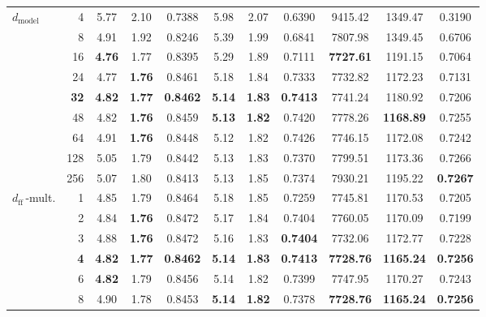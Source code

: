 \begin{longtable}{@{} l r  ccc  ccc  ccc @{}}
\multirow{9}{*}{$d_\mathrm{model}$}
  & 4            & 5.77 & 2.10 & 0.7388 & 5.98 & 2.07 & 0.6390 & 9415.42 & 1349.47 & 0.3190 \\
  & 8            & 4.91 & 1.92 & 0.8246 & 5.39 & 1.99 & 0.6841 & 7807.98 & 1349.45 & 0.6706 \\
  & 16           & \textbf{4.76} & 1.77 & 0.8395 & 5.29 & 1.89 & 0.7111 & \textbf{7727.61} & 1191.15 & 0.7064 \\
  & 24           & 4.77 & \textbf{1.76} & 0.8461 & 5.18 & 1.84 & 0.7333 & 7732.82 & 1172.23 & 0.7131 \\
  & \textbf{32}  & \textbf{4.82} & \textbf{1.77} & \textbf{0.8462} & \textbf{5.14} & \textbf{1.83} & \textbf{0.7413} & 7741.24 & 1180.92 & 0.7206 \\
  & 48           & 4.82 & \textbf{1.76} & 0.8459 & \textbf{5.13} & \textbf{1.82} & 0.7420 & 7778.26 & \textbf{1168.89} & 0.7255 \\
  & 64           & 4.91 & \textbf{1.76} & 0.8448 & 5.12 & 1.82 & 0.7426 & 7746.15 & 1172.08 & 0.7242 \\
  & 128          & 5.05 & 1.79 & 0.8442 & 5.13 & 1.83 & 0.7370 & 7799.51 & 1173.36 & 0.7266 \\
  & 256          & 5.07 & 1.80 & 0.8413 & 5.13 & 1.85 & 0.7374 & 7930.21 & 1195.22 & \textbf{0.7267} \\
\midrule[0.4pt]

\multirow{6}{*}{$d_\mathrm{ff}$\,-mult.}
  & 1            & 4.85 & 1.79 & 0.8464 & 5.18 & 1.85 & 0.7259 & 7745.81 & 1170.53 & 0.7205 \\
  & 2            & 4.84 & \textbf{1.76} & 0.8472 & 5.17 & 1.84 & 0.7404 & 7760.05 & 1170.09 & 0.7199 \\
  & 3            & 4.88 & \textbf{1.76} & 0.8472 & 5.16 & 1.83 & \textbf{0.7404} & 7732.06 & 1172.77 & 0.7228 \\
  & \textbf{4}   & \textbf{4.82} & \textbf{1.77} & \textbf{0.8462} & \textbf{5.14} & \textbf{1.83} & \textbf{0.7413} & \textbf{7728.76} & \textbf{1165.24} & \textbf{0.7256} \\
  & 6            & \textbf{4.82} & 1.79 & 0.8456 & 5.14 & 1.82 & 0.7399 & 7747.95 & 1170.27 & 0.7243 \\
  & 8            & 4.90 & 1.78 & 0.8453 & \textbf{5.14} & \textbf{1.82} & 0.7378 & \textbf{7728.76} & \textbf{1165.24} & \textbf{0.7256} \\
\midrule[0.4pt]


\end{longtable}
